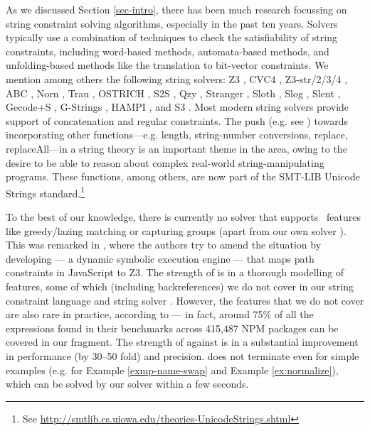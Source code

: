 \smallskip
{}
As we discussed Section \ref{sec-intro}, there has been much research
focussing on string constraint solving algorithms, especially
in the past ten years. Solvers typically use a combination
of techniques to check the satisfiability of string constraints,
including word-based methods, automata-based methods, and unfolding-based methods
like the translation to bit-vector constraints.
We mention among others the following string solvers:
Z3 \cite{Z3}, CVC4 \cite{cvc4}, Z3-str/2/3/4 \cite{Z3-str,Z3-str2,Z3-str3,BerzishMurphy2021},
 ABC \cite{ABC}, Norn
\cite{Abdulla14}, Trau \cite{Z3-trau,AbdullaACDHRR18-trau,Abdulla17}, OSTRICH
\cite{CHL+19}, S2S \cite{DBLP:conf/aplas/LeH18}, Qzy \cite{cox2017model}, Stranger \cite{Stranger}, Sloth
\cite{HJLRV18,AbdullaA+19},
Slog \cite{fang-yu-circuits}, Slent \cite{WC+18}, Gecode+S \cite{DBLP:conf/cpaior/ScottFPS17}, G-Strings \cite{DBLP:conf/cp/AmadiniGST17}, HAMPI
\cite{HAMPI}, and S3 \cite{S3}. 
Most modern string solvers provide support of concatenation and regular 
constraints. The push (e.g. see
\cite{GB16,Vijay-length,HAMPI,Berkeley-JavaScript,LB16,S3})
towards incorporating other functions---e.g. length, 
string-number conversions, replace, replaceAll---in a string theory is an
important theme in the area, owing to the desire to be able to reason 
about complex real-world string-manipulating programs.
These functions, among others, are now part of the SMT-LIB Unicode Strings
standard.\footnote{See
\url{http://smtlib.cs.uiowa.edu/theories-UnicodeStrings.shtml}}

To the best of our knowledge, there is currently no solver that
supports \regexp\ features like greedy/lazing matching or capturing
groups (apart from our own solver \ostrich). This was remarked in
\cite{LMK19}, where the authors try to amend the situation by developing 
\expose{} --- a dynamic symbolic execution engine --- that maps path 
constraints in JavaScript to Z3. The strength of \expose{} is in a thorough
modelling of \regexp{} features, some of which (including backreferences) we do 
not cover in our string constraint language and string solver \ostrich{}. However,
the features that we do not cover are also rare in practice, according to
\cite{LMK19} --- in fact, around 75\% of all the \regexp{} expressions found in
their benchmarks across 415,487 NPM packages can be covered in our fragment.
The strength of \ostrich{} against \expose{} is in a substantial improvement in
performance (by 30--50 fold) and precision. \expose{} does not terminate 
even for simple examples (e.g. for Example \ref{exmp-name-swap} and Example 
\ref{ex:normalize}), which can be solved by our solver within a few seconds.

